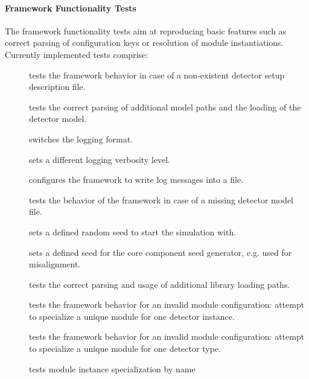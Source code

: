 \paragraph{Framework Functionality Tests}

The framework functionality tests aim at reproducing basic features such as correct parsing of configuration keys or resolution of module instantiations.
Currently implemented tests comprise:

\begin{description}
    \item[] tests the framework behavior in case of a non-existent detector setup description file.
    \item[] tests the correct parsing of additional model paths and the loading of the detector model.
    \item[] switches the logging format.
    \item[] sets a different logging verbosity level.
    \item[] configures the framework to write log messages into a file.
    \item[] tests the behavior of the framework in case of a missing detector model file.
    \item[] sets a defined random seed to start the simulation with.
    \item[] sets a defined seed for the core component seed generator, e.g. used for misalignment.
    \item[] tests the correct parsing and usage of additional library loading paths.
    \item[] tests the framework behavior for an invalid module configuration: attempt to specialize a unique module for one detector instance.
    \item[] tests the framework behavior for an invalid module configuration: attempt to specialize a unique module for one detector type.
    \item[] tests module instance specialization by name

\end{description}
